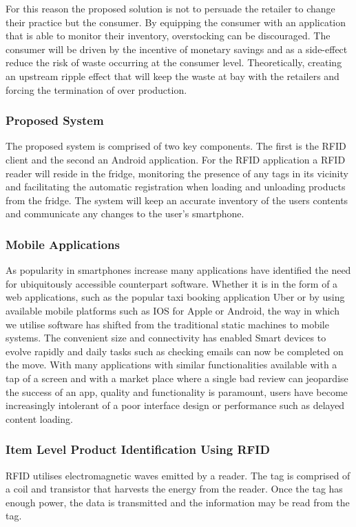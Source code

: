\documentclass[a4paper, 11pt]{article}
\begin{document}
For this reason the proposed solution is not to persuade the retailer to change their practice but the consumer. By equipping the consumer with an application that is able to monitor their inventory, overstocking can be discouraged. The consumer will be driven by the incentive of monetary savings and as a side-effect reduce the risk of waste occurring at the consumer level. Theoretically, creating an upstream ripple effect that will keep the waste at bay with the retailers and forcing the termination of over production. 

\subsubsection{Proposed System}
The proposed system is comprised of two key components. The first is the RFID client and the second an Android application. For the RFID application a RFID reader will reside in the fridge, monitoring the presence of any tags in its vicinity and facilitating the automatic registration when loading and unloading products from the fridge. The system will keep an accurate inventory of the users contents and communicate any changes to the user's smartphone.

\subsubsection{Mobile Applications}
As popularity in smartphones increase many applications have identified the need for ubiquitously accessible counterpart software. Whether it is in the form of a web applications, such as the popular taxi booking application Uber or by using available mobile platforms such as IOS for Apple or Android, the way in which we utilise software has shifted from the traditional static machines to mobile systems. The convenient size and connectivity has enabled Smart devices to evolve rapidly and daily tasks such as checking emails can now be completed on the move. With many applications with similar functionalities available with a tap of a screen and with a market place where a single bad review can jeopardise the success of an app, quality and functionality is paramount, users have become increasingly intolerant of a poor interface design or performance such as delayed content loading. 

\subsubsection{Item Level Product Identification Using RFID} 
RFID utilises electromagnetic waves emitted by a reader. The tag is comprised of a coil and transistor that harvests the energy from the reader. Once the tag has enough power, the data is transmitted and the information may be read from the tag. 
\end{document}
